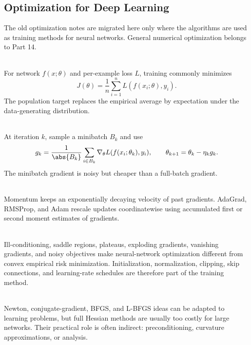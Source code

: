 \subsection{Optimization for Deep Learning}

The old optimization notes are migrated here only where the algorithms are used as training methods for neural networks.  General numerical optimization belongs to Part 14.

\begin{definition} \label{def:sl-neural-empirical-objective} \\
For network $f(x;\theta)$ and per-example loss $L$, training commonly minimizes
\[
J(\theta)=\frac1n\sum_{i=1}^nL(f(x_i;\theta),y_i).
\]
The population target replaces the empirical average by expectation under the data-generating distribution.
\end{definition}

\begin{method} \label{method:sl-sgd-minibatch} \\
At iteration $k$, sample a minibatch $B_k$ and use
\[
g_k=\frac{1}{\abs{B_k}}\sum_{i\in B_k}\nabla_{\theta}L(f(x_i;\theta_k),y_i),
\qquad
\theta_{k+1}=\theta_k-\eta_kg_k.
\]
The minibatch gradient is noisy but cheaper than a full-batch gradient.
\end{method}

\begin{definition} \label{def:sl-momentum-adaptive-methods} \\
Momentum keeps an exponentially decaying velocity of past gradients.  AdaGrad, RMSProp, and Adam rescale updates coordinatewise using accumulated first or second moment estimates of gradients.
\end{definition}

\begin{remark} \label{rem:sl-deep-optimization-challenges} \\
Ill-conditioning, saddle regions, plateaus, exploding gradients, vanishing gradients, and noisy objectives make neural-network optimization different from convex empirical risk minimization.  Initialization, normalization, clipping, skip connections, and learning-rate schedules are therefore part of the training method.
\end{remark}

\begin{remark} \label{rem:sl-second-order-methods} \\
Newton, conjugate-gradient, BFGS, and L-BFGS ideas can be adapted to learning problems, but full Hessian methods are usually too costly for large networks.  Their practical role is often indirect: preconditioning, curvature approximations, or analysis.
\end{remark}
